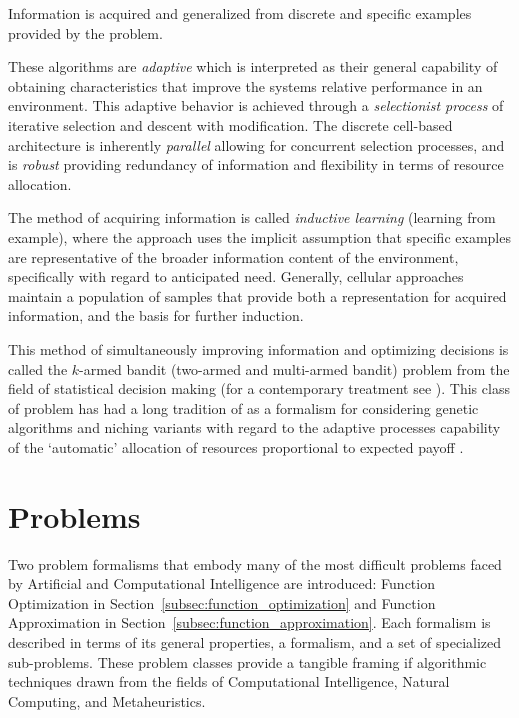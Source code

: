 \documentclass[a4paper, 11pt]{article}
\begin{document}
Information is acquired and generalized from discrete and specific examples provided by the problem.

These algorithms are \emph{adaptive} which is interpreted as their general capability of obtaining characteristics that improve the systems relative performance in an environment. This adaptive behavior is achieved through a \emph{selectionist process} of iterative selection and descent with modification. The discrete cell-based architecture is inherently \emph{parallel} allowing for concurrent selection processes, and is \emph{robust} providing redundancy of information and flexibility in terms of resource allocation. 

The method of acquiring information is called \emph{inductive learning} (learning from example), where the approach uses the implicit assumption that specific examples are representative of the broader information content of the environment, specifically with regard to anticipated need. Generally, cellular approaches maintain a population of samples that provide both a representation for acquired information, and the basis for further induction.

This method of simultaneously improving information and optimizing decisions is called the $k$-armed bandit (two-armed and multi-armed bandit) problem from the field of statistical decision making \cite{Robbins1952} (for a contemporary treatment see \cite{Bergemann2006}). This class of problem has had a long tradition of as a formalism for considering genetic algorithms and niching variants with regard to the adaptive processes capability of the `automatic' allocation of resources proportional to expected payoff \cite{Goldberg1989}.




% 
% 
\section{Problems}
\label{sec:problems}


Two problem formalisms that embody many of the most difficult problems faced by Artificial and Computational Intelligence are introduced: Function Optimization in Section~\ref{subsec:function_optimization} and Function Approximation in Section~\ref{subsec:function_approximation}. Each formalism is described in terms of its general properties, a formalism, and a set of specialized sub-problems. These problem classes provide a tangible framing if algorithmic techniques drawn from the fields of Computational Intelligence, Natural Computing, and Metaheuristics.
\end{document}
